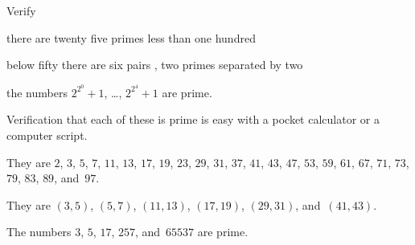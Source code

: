\documentclass{ibl}  %
\begin{document}
\begin{problem}[\maxlength]
Verify 
\begin{items}
\item there are twenty five primes less than one hundred
\item below fifty there are six pairs , two primes
  separated by two
\item the numbers $2^{2^0}+1$, \ldots, $2^{2^4}+1$ are prime.
\end{items}
\begin{answer}
Verification that each of these is prime is easy with a pocket calculator
or a computer script.
\begin{items}
\item 
  They are $2$, $3$, $5$, $7$, $11$, $13$, $17$, $19$, $23$, $29$, $31$, 
  $37$, $41$, $43$, $47$, $53$, $59$, $61$, $67$, $71$, $73$, $79$, $83$, 
  $89$, and~$97$.
\item 
  They are  $(3, 5)$, $(5, 7)$, $(11, 13)$, $(17, 19)$, 
  $(29, 31)$, and~$(41, 43)$.
\item
  The numbers $3$, $5$, $17$, $257$, and~$65537$ are prime.
\end{items}
\end{answer}
\end{problem}
\end{document}
